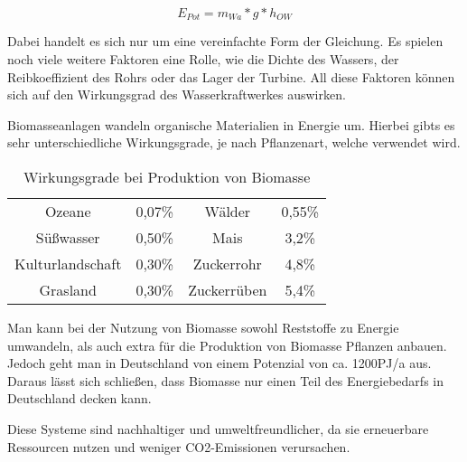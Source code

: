 \begin{equation*}
    E_{Pot} = m_{Wa} * g * h_{OW}
\end{equation*}

Dabei handelt es sich nur um eine vereinfachte Form der Gleichung. Es spielen noch
viele weitere Faktoren eine Rolle, wie die Dichte des Wassers, der
Reibkoeffizient des Rohrs oder das Lager der Turbine. All diese Faktoren können
sich auf den Wirkungsgrad des Wasserkraftwerkes
auswirken.\cite{aufleger2020stromerzeugung}

Biomasseanlagen wandeln organische Materialien in Energie um. Hierbei gibts es
sehr unterschiedliche Wirkungsgrade, je nach Pflanzenart, welche verwendet
wird.

\begin{table}[h]
    \centering
    \captionsetup{font=small}
    \caption{Wirkungsgrade bei Produktion von Biomasse}
    \label{tab:tabelle1}
    \begin{tabular}{cc|cc}
        Ozeane           & 0,07\% & Wälder      & 0,55\% \\
        Süßwasser        & 0,50\% & Mais        & 3,2\%  \\
        Kulturlandschaft & 0,30\% & Zuckerrohr  & 4,8\%  \\
        Grasland         & 0,30\% & Zuckerrüben & 5,4\%
    \end{tabular}
\end{table}

Man kann bei der Nutzung von Biomasse sowohl Reststoffe zu Energie umwandeln,
als auch extra für die Produktion von Biomasse Pflanzen anbauen. Jedoch geht
man in Deutschland von einem Potenzial von ca. 1200PJ/a aus. Daraus lässt sich
schließen, dass Biomasse nur einen Teil des Energiebedarfs in Deutschland
decken kann. \cite{quaschning2021regenerative}

Diese Systeme sind nachhaltiger und umweltfreundlicher, da sie erneuerbare
Ressourcen nutzen und weniger CO2-Emissionen verursachen.